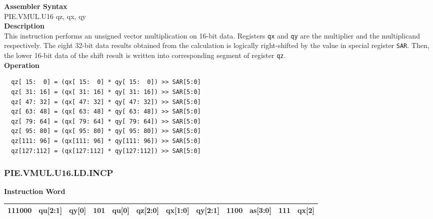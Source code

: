 \textbf{Assembler Syntax} \\
PIE.VMUL.U16 qz, qx, qy \\
\textbf{Description} \\
This instruction performs an unsigned vector multiplication on 16-bit data. Registers \lstinline{qx} and \lstinline{qy} are the multiplier and the multiplicand respectively. The eight 32-bit data results obtained from the calculation is logically right-shifted by the value in special register \lstinline{SAR}. Then, the lower 16-bit data of the shift result is written into corresponding segment of register \lstinline{qz}.\\
\textbf{Operation}
\begin{lstlisting}
  qz[ 15:  0] = (qx[ 15:  0] * qy[ 15:  0]) >> SAR[5:0]
  qz[ 31: 16] = (qx[ 31: 16] * qy[ 31: 16]) >> SAR[5:0]
  qz[ 47: 32] = (qx[ 47: 32] * qy[ 47: 32]) >> SAR[5:0]
  qz[ 63: 48] = (qx[ 63: 48] * qy[ 63: 48]) >> SAR[5:0]
  qz[ 79: 64] = (qx[ 79: 64] * qy[ 79: 64]) >> SAR[5:0]
  qz[ 95: 80] = (qx[ 95: 80] * qy[ 95: 80]) >> SAR[5:0]
  qz[111: 96] = (qx[111: 96] * qy[111: 96]) >> SAR[5:0]
  qz[127:112] = (qx[127:112] * qy[127:112]) >> SAR[5:0]
\end{lstlisting}

\newpage
\subsubsection{PIE.VMUL.U16.LD.INCP}\label{instruction:PIEVMULU16LDINCP}
\setlength\tabcolsep{6pt}
\textbf{Instruction Word} \\
\begin{tabular}{|c|c|c|c|c|c|c|c|c|c|c|c|}
	\hline
	111000 & qu[2:1] & qy[0] & 101 & qu[0] & qz[2:0] & qx[1:0] & qy[2:1] & 1100 & as[3:0] & 111 & qx[2] \\
	\hline
\end{tabular}

